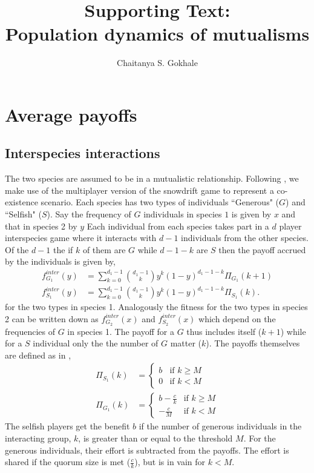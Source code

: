 \documentclass[times,onecolumn]{scrartcl}
\begin{document}
\title{Supporting Text: \\
Population dynamics of mutualisms}

\author{
Chaitanya S. Gokhale 
}

\maketitle

\section{Average payoffs}
\subsection{Interspecies interactions}
\label{appA}

The two species are assumed to be in a mutualistic relationship.
Following \cite{bergstrom:PNAS:2003,souza:JTB:2009,gokhale:PRSB:2012}, we make use of the multiplayer version of the snowdrift game to represent a co-existence scenario.
Each species has two types of individuals ``Generous" ($G$) and ``Selfish" ($S$).
Say the frequency of $G$ individuals in species $1$ is given by $x$ and that in species 2 by $y$
Each individual from each species takes part in a $d$ player interspecies game where it interacts with $d-1$ individuals from the other species.
Of the $d-1$ the if $k$ of them are $G$ while $d-1-k$ are $S$ then the payoff accrued by the individuals is given by,
%
\begin{align}
f^{inter}_{G_1} (y) &= \sum_{k=0}^{d_1 -1} \binom{d_1 -1}{k}y^k (1-y)^{d_1 -1-k} \Pi_{G_1}(k+1) \\
f^{inter}_{S_1} (y) &= \sum_{k=0}^{d_1 -1} \binom{d_1 -1}{k}y^k (1-y)^{d_1 -1-k} \Pi_{S_1}(k).
\label{interfiteqs}
\end{align}
%
for the two types in species 1.
Analogously the fitness for the two types in species 2 can be written down as $f^{inter}_{G_2} (x)$ and $f^{inter}_{S_2} (x)$ which depend on the frequencies of $G$ in species 1.
The payoff for a $G$ thus includes itself ($k+1$) while for a $S$ individual only the the number of $G$ matter ($k$).
The payoffs themselves are defined as in \cite{souza:JTB:2009},
%
\begin{align}
\Pi_{S_1} (k) & = \begin{cases} b & \textrm{if } k \geq M \\ 0 & \textrm{if } k < M \end{cases}
\\
\Pi_{G_1} (k) & = \begin{cases} b-\frac{c}{k} & \textrm{if } k \geq M \\  -\frac{c}{M} & \textrm{if } k < M \end{cases}
\label{eqintergamepayoffs}
\end{align}
%
The selfish players get the benefit $b$ if the number of generous individuals in the interacting group, $k$, is greater than or equal to the threshold $M$.
For the generous individuals, their effort is subtracted from the payoffs.
The effort is shared if the quorum size is met ($\frac{c}{k}$), but is in vain for $k<M$.
\end{document}
